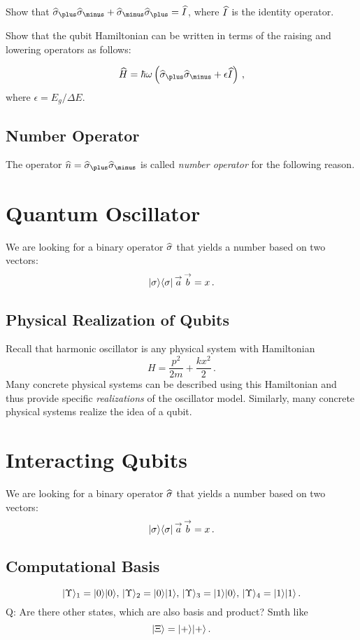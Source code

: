 \begin{exercise}
	Show that  $\op{\sigma}_\plus \op{\sigma}_\minus+\op{\sigma}_\minus \op{\sigma}_\plus=\op{I}$, where $\widehat{I}$ is the identity operator.
\end{exercise}

\begin{exercise}
	Show that the qubit Hamiltonian can be written in terms of the raising and lowering operators as follows:
	
	\[
	\op{H} = \hbar\omega\left(\op{\sigma}_\plus \op{\sigma}_\minus+\epsilon\op{I} \right)\,,
	\]
	where $\epsilon=E_g/\Delta E$.
\end{exercise}

\subsection{Number Operator}
The operator $\op{n}=\op{\sigma}_\plus \op{\sigma}_\minus$ is called \emph{number operator} for the following reason. 

\section{Quantum Oscillator}\label{sec:QuantumOscillator}
We are looking for a binary operator $\widehat{\sigma}$ that yields a number
based on two vectors:
\[
|{\sigma}\rangle\langle{\sigma}|\,\overset{\rightarrow}{a}\,\overset{\rightarrow}{b}=x\,.
\]



\subsection{Physical Realization of Qubits}
Recall that harmonic oscillator is any physical system with Hamiltonian
\[
H = \frac{p^2}{2m}+\frac{kx^2}{2}\,.
\] 
Many concrete physical systems can be described using this Hamiltonian and thus provide specific \emph{realizations} of 
the oscillator model. Similarly, many concrete physical systems realize the idea of a qubit.

\section{Interacting Qubits}\label{sec:InteractingQubits}
We are looking for a binary operator $\widehat{\sigma}$ that yields a number
based on two vectors:
\[
|{\sigma}\rangle\langle{\sigma}|\,\overset{\rightarrow}{a}\,\overset{\rightarrow}{b}=x\,.
\]
\subsection{Computational Basis}
\[
|{\Upsilon}\rangle_1 = |{0}\rangle|{0}\rangle,\,|{\Upsilon}\rangle_2 = |{0}\rangle|{1}\rangle,\,
|{\Upsilon}\rangle_3 = |{1}\rangle|{0}\rangle,\,|{\Upsilon}\rangle_4 = |{1}\rangle|{1}\rangle\,.
\]
Q: Are there other states, which are also basis and product? Smth like
\[
|{\Xi}\rangle=|{+}\rangle|{+}\rangle\,.
\]

